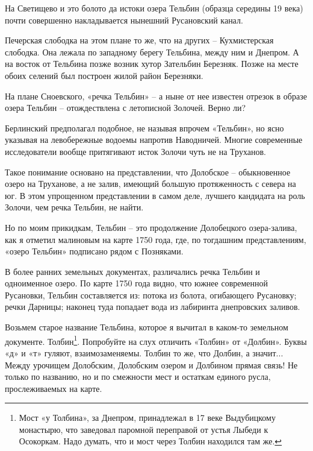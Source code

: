 На Светищево и это болото да истоки озера Тельбин (образца середины 19 века) почти совершенно накладывается нынешний Русановский канал.

Печерская слободка на этом плане то же, что на других – Кухмистерская слободка. Она лежала по западному берегу Тельбина, между ним и Днепром. А на восток от Тельбина позже возник хутор Зательбин Березняк. Позже на месте обоих селений был построен жилой район Березняки.




На плане Сноевского, «речка Тельбин» – а ныне от нее известен отрезок в образе озера Тельбин – отождествлена с летописной Золочей. Верно ли?

Берлинский предполагал подобное, не называя впрочем «Тельбин», но ясно указывая на левобережные водоемы напротив Наводничей. Многие современные исследователи вообще притягивают исток Золочи чуть не на Труханов.

Такое понимание основано на представлении, что Долобское – обыкновенное озеро на Труханове, а не залив, имеющий большую протяженность с севера на юг. В этом упрощенном представлении в самом деле, лучшего кандидата на роль Золочи, чем речка Тельбин, не найти.

Но по моим прикидкам, Тельбин – это продолжение Долобецкого озера-залива, как я отметил малиновым на карте 1750 года, где, по тогдашним представлениям, «озеро Тельбин» подписано рядом с Позняками.

В более ранних земельных документах, различались речка Тельбин и одноименное озеро. По карте 1750 года видно, что южнее современной Русановки, Тельбин составляется из: потока из болота, огибающего Русановку; речки Дарницы; наконец туда попадает вода из лабиринта днепровских заливов.

Возьмем старое название Тельбина, которое я вычитал в каком-то земельном документе. Толбин\footnote{Мост «у Толбина», за Днепром, принадлежал в 17 веке Выдубицкому монастырю, что заведовал паромной переправой от устья Лыбеди к Осокоркам. Надо думать, что и мост через Толбин находился там же.}. Попробуйте на слух отличить «Толбин» от «Долбин». Буквы «д» и «т» гуляют, взаимозаменяемы. Толбин то же, что Долбин, а значит... Между урочищем Долобским, Долобским озером и Долбином прямая связь! Не только по названию, но и по смежности мест и остаткам единого русла, прослеживаемых на карте.

